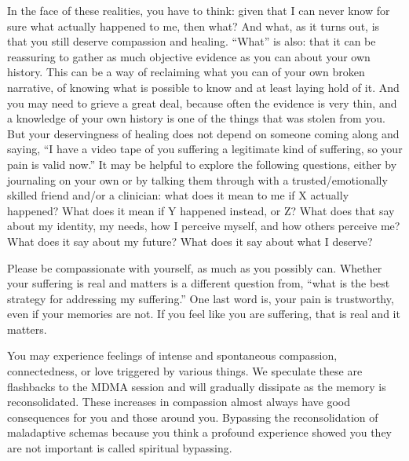 \documentclass[12pt,letterpaper]{article}
\begin{document}
In the face of these realities, you have to think: given that I can never know for sure what actually happened to me, then what?  And what, as it turns out, is that you still deserve compassion and healing.  “What” is also: that it can be reassuring to gather as much objective evidence as you can about your own history.  This can be a way of reclaiming what you can of your own broken narrative, of knowing what is possible to know and at least laying hold of it.  And you may need to grieve a great deal, because often the evidence is very thin, and a knowledge of your own history is one of the things that was stolen from you. But your deservingness of healing does not depend on someone coming along and saying, “I have a video tape of you suffering a legitimate kind of suffering, so your pain is valid now.”  It may be helpful to explore the following questions, either by journaling on your own or by talking them through with a trusted/emotionally skilled friend and/or a clinician: what does it mean to me if X actually happened?  What does it mean if Y happened instead, or Z? What does that say about my identity, my needs, how I perceive myself, and how others perceive me?  What does it say about my future?  What does it say about what I deserve?  

Please be compassionate with yourself, as much as you possibly can. Whether your suffering is real and matters is a different question from, “what is the best strategy for addressing my suffering.” One last word is, your pain is trustworthy, even if your memories are not.  If you feel like you are suffering, that is real and it matters.  

You may experience feelings of intense and spontaneous compassion, connectedness, or love triggered by various things. We speculate these are flashbacks to the MDMA session and will gradually dissipate as the memory is reconsolidated. These increases in compassion almost always have good consequences for you and those around you. Bypassing the reconsolidation of maladaptive schemas because you think a profound experience showed you they are not important is called spiritual bypassing. 
\end{document}
